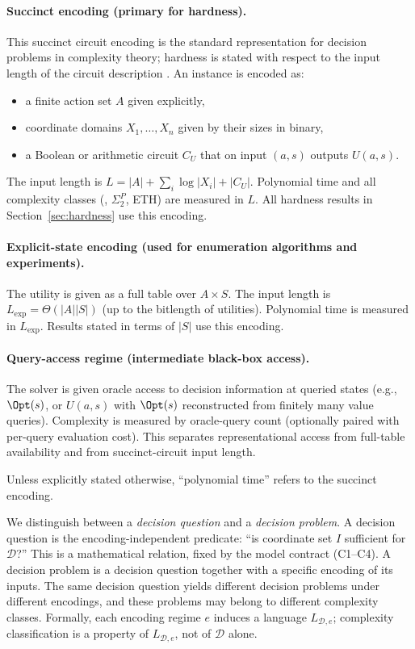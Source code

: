 \paragraph{Succinct encoding (primary for hardness).}
This succinct circuit encoding is the standard representation for decision problems in complexity theory; hardness is stated with respect to the input length of the circuit description \cite{arora2009computational,papadimitriou1994complexity}.
An instance is encoded as:
\begin{itemize}
\item a finite action set $A$ given explicitly,
\item coordinate domains $X_1,\ldots,X_n$ given by their sizes in binary,
\item a Boolean or arithmetic circuit $C_U$ that on input $(a,s)$ outputs $U(a,s)$.
\end{itemize}
The input length is $L = |A| + \sum_i \log |X_i| + |C_U|$. Polynomial time and all complexity classes (\coNP, $\Sigma_2^P$, ETH) are measured in $L$. All hardness results in Section~\ref{sec:hardness} use this encoding.

\paragraph{Explicit-state encoding (used for enumeration algorithms and experiments).}
The utility is given as a full table over $A \times S$. The input length is $L_{\text{exp}} = \Theta(|A||S|)$ (up to the bitlength of utilities). Polynomial time is measured in $L_{\text{exp}}$. Results stated in terms of $|S|$ use this encoding.

\paragraph{Query-access regime (intermediate black-box access).}
The solver is given oracle access to decision information at queried states (e.g., $\Opt(s)$, or $U(a,s)$ with $\Opt(s)$ reconstructed from finitely many value queries). Complexity is measured by oracle-query count (optionally paired with per-query evaluation cost). This separates representational access from full-table availability and from succinct-circuit input length.

Unless explicitly stated otherwise, ``polynomial time'' refers to the succinct encoding.

\begin{remark}\label{rem:question-vs-problem}
We distinguish between a \emph{decision question} and a \emph{decision problem}. A decision question is the encoding-independent predicate: ``is coordinate set $I$ sufficient for $\mathcal{D}$?'' This is a mathematical relation, fixed by the model contract (C1--C4). A decision problem is a decision question together with a specific encoding of its inputs. The same decision question yields different decision problems under different encodings, and these problems may belong to different complexity classes. Formally, each encoding regime $e$ induces a language $L_{\mathcal{D},e}$; complexity classification is a property of $L_{\mathcal{D},e}$, not of $\mathcal{D}$ alone.
\end{remark}


